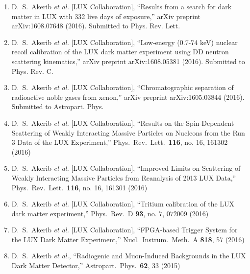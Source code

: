 \documentclass[a4paper,10pt]{article}
\begin{document}
\begin{enumerate}  

\item D.~S.~Akerib {\it et al.} [LUX Collaboration], ``Results from a search for dark matter in LUX with 332 live days of exposure,'' arXiv preprint arXiv:1608.07648 (2016). Submitted to Phys. Rev. Lett.

\item D.~S.~Akerib {\it et al.} [LUX Collaboration],
  ``Low-energy (0.7-74 keV) nuclear recoil calibration of the LUX dark matter experiment using DD neutron scattering kinematics,'' arXiv preprint arXiv:1608.05381 (2016). Submitted to Phys. Rev. C.

\item D.~S.~Akerib {\it et al.} [LUX Collaboration],
  ``Chromatographic separation of radioactive noble gases from xenon,''
  arXiv preprint arXiv:1605.03844 (2016). Submitted to Astropart. Phys.
  
\item   D.~S.~Akerib {\it et al.} [LUX Collaboration],
  ``Results on the Spin-Dependent Scattering of Weakly Interacting Massive Particles on Nucleons from the Run 3 Data of the LUX Experiment,''
  Phys.\ Rev.\ Lett.\  {\bf 116}, no. 16, 161302 (2016)
  
\item   D.~S.~Akerib {\it et al.} [LUX Collaboration],
  ``Improved Limits on Scattering of Weakly Interacting Massive Particles from Reanalysis of 2013 LUX Data,''
  Phys.\ Rev.\ Lett.\  {\bf 116}, no. 16, 161301 (2016)
  
\item   D.~S.~Akerib {\it et al.} [LUX Collaboration],
  ``Tritium calibration of the LUX dark matter experiment,''
  Phys.\ Rev.\ D {\bf 93}, no. 7, 072009 (2016)
  
\item   D.~S.~Akerib {\it et al.} [LUX Collaboration],
  ``FPGA-based Trigger System for the LUX Dark Matter Experiment,''
  Nucl.\ Instrum.\ Meth.\ A {\bf 818}, 57 (2016)
  
\item   D.~S.~Akerib {\it et al.},
  ``Radiogenic and Muon-Induced Backgrounds in the LUX Dark Matter Detector,''
  Astropart.\ Phys.\  {\bf 62}, 33 (2015)
  

\end{enumerate}
\end{document}
